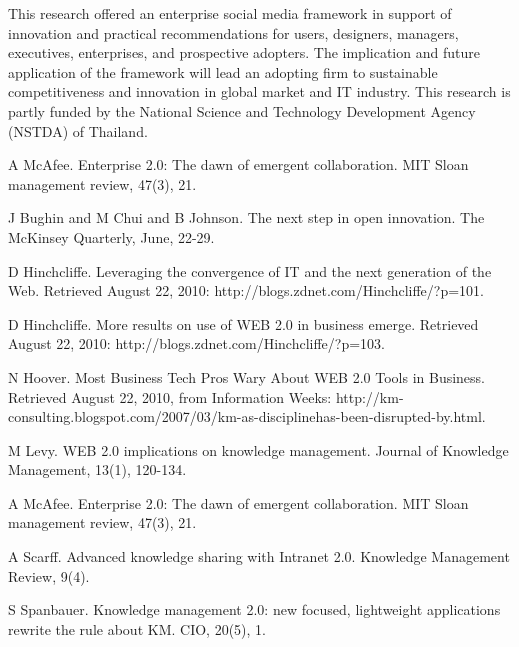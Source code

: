 \documentclass[article,A4,11pt]{llncs}%
\begin{document}
This research offered an enterprise social media framework in support of innovation and practical recommendations for users, designers, managers, executives, enterprises, and prospective adopters. The implication and future application of the framework will lead an adopting firm to sustainable competitiveness and innovation in global market and IT industry. This research is partly funded by the National Science and Technology Development Agency (NSTDA) of Thailand.



\begin{thebibliography}{10}
{\sc A McAfee}. {Enterprise 2.0: The dawn of emergent collaboration}. MIT Sloan management review, 47(3), 21.

{\sc J Bughin and M Chui and B Johnson}. {The next step in open innovation}. The McKinsey Quarterly, June, 22-29.

{\sc D Hinchcliffe}. {Leveraging the convergence of IT and the next generation of the Web}. Retrieved August 22, 2010: http://blogs.zdnet.com/Hinchcliffe/?p=101.

{\sc D Hinchcliffe}. {More results on use of WEB 2.0 in business emerge}. Retrieved August 22, 2010: http://blogs.zdnet.com/Hinchcliffe/?p=103.

{\sc N Hoover}. {Most Business Tech Pros Wary About WEB 2.0 Tools in Business}. Retrieved August 22, 2010, from Information Weeks: http://km-consulting.blogspot.com/2007/03/km-as-disciplinehas-been-disrupted-by.html.

{\sc M Levy}. {WEB 2.0 implications on knowledge management}. Journal of Knowledge Management, 13(1), 120-134.

{\sc A McAfee}. {Enterprise 2.0: The dawn of emergent collaboration}. MIT Sloan management review, 47(3), 21.

{\sc A Scarff}. {Advanced knowledge sharing with Intranet 2.0}. Knowledge Management Review, 9(4).

{\sc S Spanbauer}. {Knowledge management 2.0: new focused, lightweight applications rewrite the rule about KM}. CIO, 20(5), 1.
\end{thebibliography}
\end{document}
